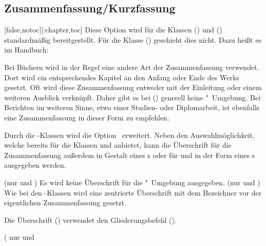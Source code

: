 \begin{Declaration*}{}
\begin{Declaration*}{}
\begin{Declaration*}{}
\subsection{Zusammenfassung/Kurzfassung}
%
%
\begin{Declaration}[%
  v2.02!\Option{abstract=multiple}:ersetzt \Option{abstract=double}'none';%
  v2.02!\Option{abstract=tocleveldown};%
  v2.02!\Option{abstract=markboth};%
  v2.04!\Option{abstract=tocmultiple}%
]{}[false,notoc][:chapter,toc]%
\printdeclarationlist%
%
%
Diese Option wird für die Klassen () 
und () standardmäßig bereitgestellt. Für 
die Klasse () geschieht dies nicht. Dazu 
heißt es im Handbuch:
%
\begin{quoting}
Bei Büchern wird in der Regel eine andere Art der Zusammenfassung verwendet. 
Dort wird ein entsprechendes Kapitel an den Anfang oder Ende des Werks gesetzt. 
Oft wird diese Zusammenfassung entweder mit der Einleitung oder einem weiteren 
Ausblick verknüpft. Daher gibt es bei () 
generell keine "~Umgebung. Bei Berichten im weiteren 
Sinne, etwa einer Studien- oder Diplomarbeit, ist ebenfalls eine 
Zusammenfassung in dieser Form zu empfehlen.
\end{quoting}
%
Durch die \TUDScript-Klassen wird die Option~ erweitert. 
Neben den Auswahlmöglichkeit, welche bereits \KOMAScript{} für die Klassen 
 und  anbietet, kann die Überschrift für 
die Zusammenfassung außerdem in Gestalt eines \sectionautorefname{}s oder für 
 und  in der Form eines 
\chapterautorefname{}s ausgegeben werden.
%
\begin{values}{}
\itemfalse(nur  und )
  Es wird keine Überschrift für die "~Umgebung ausgegeben.
\itemtrue*(nur  und )
  Wie bei den \KOMAScript-Klassen wird eine zentrierte Überschrift mit dem 
  Bezeichner  vor der eigentlichen Zusammenfassung gesetzt.
\item[section/addsec]
  Die Überschrift () verwendet den Gliederungsbefehl 
  ().
\item[chapter/addchap][\Class{tudscrbook}](%
    nur  und %

\end{values}
\end{Declaration}
\end{Declaration*}
\end{Declaration*}
\end{Declaration*}
